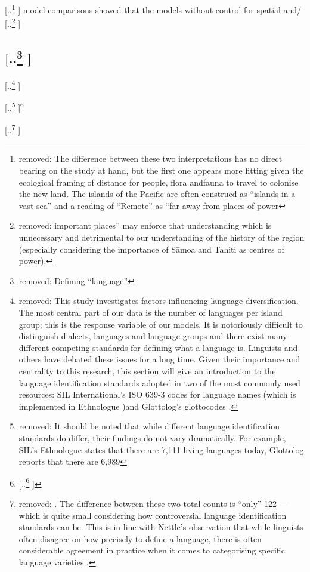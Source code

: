 \documentclass[unnumsec,webpdf,modern,medium]{oup-authoring-template}
\providecommand{\DIFaddtex}[1]{{\protect\color{blue} \sf #1}} %
\providecommand{\DIFdeltex}[1]{{\protect\color{red} [..\footnote{removed: #1} ]}} %
\providecommand{\DIFaddbegin}{} %
\providecommand{\DIFaddend}{} %
\providecommand{\DIFdelbegin}{} %
\providecommand{\DIFdelend}{} %
\providecommand{\DIFadd}[1]{\texorpdfstring{\DIFaddtex{#1}}{#1}} %
\providecommand{\DIFdel}[1]{\texorpdfstring{\DIFdeltex{#1}}{}} %
\newcommand{\DIFscaledelfig}{0.5}
\newlength{\DIFdelgraphicswidth} %
\newlength{\DIFdelgraphicsheight} %
\newcommand{\DIFaddincludegraphics}[2][]{{\color{blue}\fbox{\DIFOincludegraphics[#1]{#2}}}} %
\newcommand{\DIFdelincludegraphics}[2][]{%
\sbox{\DIFdelgraphicsbox}{\DIFOincludegraphics[#1]{#2}}%
\settoboxwidth{\DIFdelgraphicswidth}{\DIFdelgraphicsbox} %
\settoboxtotalheight{\DIFdelgraphicsheight}{\DIFdelgraphicsbox} %
\scalebox{\DIFscaledelfig}{%
\parbox[b]{\DIFdelgraphicswidth}{\usebox{\DIFdelgraphicsbox}\\[-\baselineskip] \rule{\DIFdelgraphicswidth}{0em}}\llap{\resizebox{\DIFdelgraphicswidth}{\DIFdelgraphicsheight}{%
\setlength{\unitlength}{\DIFdelgraphicswidth}%
\begin{picture}(1,1)%
\thicklines\linethickness{2pt} %
{\color[rgb]{1,0,0}\put(0,0){\framebox(1,1){}}}%
{\color[rgb]{1,0,0}\put(0,0){\line( 1,1){1}}}%
{\color[rgb]{1,0,0}\put(0,1){\line(1,-1){1}}}%
\end{picture}%
}\hspace*{3pt}}} %
} %
\DeclareRobustCommand{\DIFaddbegin}{\DIFOaddbegin \let\includegraphics\DIFaddincludegraphics} %
\DeclareRobustCommand{\DIFaddend}{\DIFOaddend \let\includegraphics\DIFOincludegraphics} %
\DeclareRobustCommand{\DIFdelbegin}{\DIFOdelbegin \let\includegraphics\DIFdelincludegraphics} %
\DeclareRobustCommand{\DIFdelend}{\DIFOaddend \let\includegraphics\DIFOincludegraphics} %
\begin{document}
\DIFdel{The difference between these two interpretations has no direct bearing on the study at hand, but the first one appears more fitting given the ecological framing of distance for people, flora andfauna to travel to colonise the new land. The islands of the Pacific are often construed as ``islands in a vast sea'' \citep{hauofa_1993} and a reading of ``Remote'' as ``far away from places of power}\DIFdelend \DIFaddbegin \DIFadd{model comparisons showed that the models without control for spatial and}\DIFaddend /\DIFdelbegin \DIFdel{important places'' may enforce that understanding which is unnecessary and detrimental to our understanding of the history of the region (especially considering the importance of S\={a}moa and Tahiti as centres of power). 
}%

\subsection{\DIFdel{Defining ``language''}}
\addtocounter{subsection}{-1}%
\DIFdel{This study investigates factors influencing language diversification. The most central part of our data is the number of languages per island group; this is the response variable of our models. It is notoriously difficult to distinguish dialects, languages and language groups and there exist many different competing standards for defining what a language is. Linguists and others have debated these issues for a long time. Given their importance and centrality to this research, this section will give an introduction to the language identification standards adopted in two of the most commonly used resources: SIL International's ISO 639-3 codes for language names (which is implemented in Ethnologue \citep{ethnologue22})and Glottolog's glottocodes \citet{glottolog3}. }%

\DIFdel{It should be noted that while different language identification standards do differ, their findings do not vary dramatically. For example, SIL's Ethnologue states that there are 7,111 living languages today, Glottolog reports that there are 6,989}\footnote{\DIFdel{This the number of languoids in glottolog classifies as ``language'' and not labelled as ``extinct''.}}%
\addtocounter{footnote}{-1}%
\DIFdel{. The difference between these two total counts is ``only'' 122 --- which is quite small considering how controversial language identification standards can be. This is in line with Nettle's observation that while linguists often disagree on how precisely to define a language, there is often considerable agreement in practice when it comes to categorising specific language varieties \citep[356]{NETTLE1998}.
}%
\end{document}
